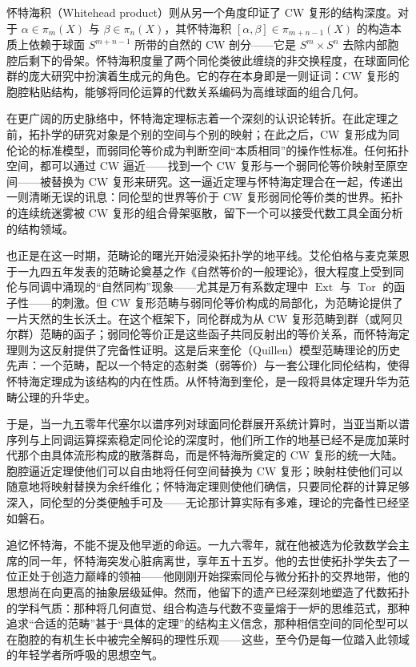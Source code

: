 \documentclass[12pt,a4paper]{article}
\begin{document}
怀特海积（Whitehead product）则从另一个角度印证了 CW 复形的结构深度。对于 $\alpha\in\pi_m(X)$ 与 $\beta\in\pi_n(X)$，其怀特海积 $[\alpha,\beta]\in\pi_{m+n-1}(X)$ 的构造本质上依赖于球面 $S^{m+n-1}$ 所带的自然的 CW 剖分——它是 $S^m\times S^n$ 去除内部胞腔后剩下的骨架。怀特海积度量了两个同伦类彼此缠绕的非交换程度，在球面同伦群的庞大研究中扮演着生成元的角色。它的存在本身即是一则证词：CW 复形的胞腔粘贴结构，能够将同伦运算的代数关系编码为高维球面的组合几何。

在更广阔的历史脉络中，怀特海定理标志着一个深刻的认识论转折。在此定理之前，拓扑学的研究对象是个别的空间与个别的映射；在此之后，CW 复形成为同伦论的标准模型，而弱同伦等价成为判断空间“本质相同”的操作性标准。任何拓扑空间，都可以通过 CW 逼近——找到一个 CW 复形与一个弱同伦等价映射至原空间——被替换为 CW 复形来研究。这一逼近定理与怀特海定理合在一起，传递出一则清晰无误的讯息：同伦型的世界等价于 CW 复形弱同伦等价类的世界。拓扑的连续统迷雾被 CW 复形的组合骨架驱散，留下一个可以接受代数工具全面分析的结构领域。

也正是在这一时期，范畴论的曙光开始浸染拓扑学的地平线。艾伦伯格与麦克莱恩于一九四五年发表的范畴论奠基之作《自然等价的一般理论》，很大程度上受到同伦与同调中涌现的“自然同构”现象——尤其是万有系数定理中 $\operatorname{Ext}$ 与 $\operatorname{Tor}$ 的函子性——的刺激。但 CW 复形范畴与弱同伦等价构成的局部化，为范畴论提供了一片天然的生长沃土。在这个框架下，同伦群成为从 CW 复形范畴到群（或阿贝尔群）范畴的函子；弱同伦等价正是这些函子共同反射出的等价关系，而怀特海定理则为这反射提供了完备性证明。这是后来奎伦（Quillen）模型范畴理论的历史先声：一个范畴，配以一个特定的态射类（弱等价）与一套公理化同伦结构，使得怀特海定理成为该结构的内在性质。从怀特海到奎伦，是一段将具体定理升华为范畴公理的升华史。

于是，当一九五零年代塞尔以谱序列对球面同伦群展开系统计算时，当亚当斯以谱序列与上同调运算探索稳定同伦论的深度时，他们所工作的地基已经不是庞加莱时代那个由具体流形构成的散落群岛，而是怀特海所奠定的 CW 复形的统一大陆。胞腔逼近定理使他们可以自由地将任何空间替换为 CW 复形；映射柱使他们可以随意地将映射替换为余纤维化；怀特海定理则使他们确信，只要同伦群的计算足够深入，同伦型的分类便触手可及——无论那计算实际有多难，理论的完备性已经坚如磐石。

追忆怀特海，不能不提及他早逝的命运。一九六零年，就在他被选为伦敦数学会主席的同一年，怀特海突发心脏病离世，享年五十五岁。他的去世使拓扑学失去了一位正处于创造力巅峰的领袖——他刚刚开始探索同伦与微分拓扑的交界地带，他的思想尚在向更高的抽象层级延伸。然而，他留下的遗产已经深刻地塑造了代数拓扑的学科气质：那种将几何直觉、组合构造与代数不变量熔于一炉的思维范式，那种追求“合适的范畴”甚于“具体的定理”的结构主义信念，那种相信空间的同伦型可以在胞腔的有机生长中被完全解码的理性乐观——这些，至今仍是每一位踏入此领域的年轻学者所呼吸的思想空气。
\end{document}
